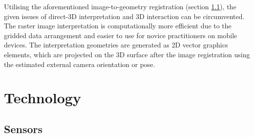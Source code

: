 \documentclass[review]{elsarticle}
\begin{document}
Utilising the aforementioned image-to-geometry registration (section \ref{}), the given issues of direct-3D interpretation and 3D interaction can be circumvented. The raster image interpretation is computationally more efficient due to the gridded data arrangement and easier to use for novice practitioners on mobile devices. The interpretation geometries are generated as 2D vector graphics elements, which are projected on the 3D surface after the image registration using the estimated external camera orientation or pose. 


\section{Technology}
\label{sec:technology}

\subsection{Sensors}
\end{document}
